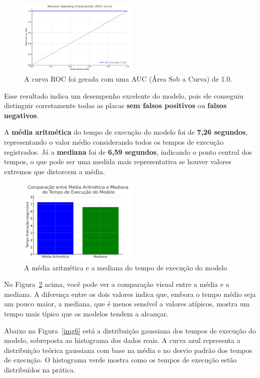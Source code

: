 \documentclass[conference]{IEEEtran}
\begin{document}
\begin{figure}[htbp]
	\centerline{\includegraphics[width=0.5\textwidth]{img4.png}}
	\caption{A curva ROC foi gerada com uma AUC (Área Sob a Curva) de 1.0.}
	\label{img4}
\end{figure}

Esse resultado indica um desempenho excelente do modelo, pois ele conseguiu distinguir corretamente todas as placas \textbf{sem falsos positivos} ou \textbf{falsos negativos}.

A \textbf{média aritmética} do tempo de execução do modelo foi de \textbf{7,26 segundos}, representando o valor médio considerando todos os tempos de execução registrados. Já a \textbf{mediana} foi de \textbf{6,59 segundos}, indicando o ponto central dos tempos, o que pode ser uma medida mais representativa se houver valores extremos que distorcem a média.

\begin{figure}[htbp]
	\centerline{\includegraphics[width=0.5\textwidth]{img5.png}}
	\caption{A média aritmética e a mediana do tempo de execução do modelo}
	\label{img5}
\end{figure}

No Figura~\ref{img5} acima, você pode ver a comparação visual entre a média e a mediana. A diferença entre os dois valores indica que, embora o tempo médio seja um pouco maior, a mediana, que é menos sensível a valores atípicos, mostra um tempo mais típico que os modelos tendem a alcançar.

Abaixo na Figura~\ref{img6} está a distribuição gaussiana dos tempos de execução do modelo, sobreposta ao histograma dos dados reais. A curva azul representa a distribuição teórica gaussiana com base na média e no desvio padrão dos tempos de execução. O histograma verde mostra como os tempos de execução estão distribuídos na prática.
\end{document}
